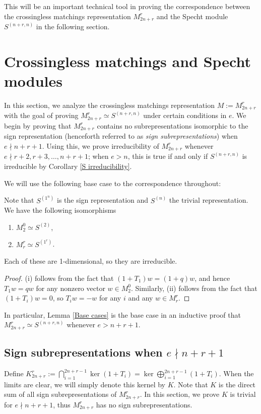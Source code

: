 \documentclass{amsart}
\begin{document}
This will be an important technical tool in proving the correspondence between the crossingless matchings representation $M_{2n + r}^r$ and the Specht module $S^{(n+r,n)}$ in the following section. 

\section{Crossingless matchings and Specht modules}\label{Crossingless Matchings Section}
In this section, we analyze the crossingless matchings representation $M := M_{2n + r}^r$ with the goal of proving $M_{2n + r}^r \simeq S^{(n+r,n)}$ under certain conditions in $e$.
We begin by proving that $M_{2n + r}^r$ contains no subrepresentations isomorphic to the sign representation (henceforth referred to as \emph{sign subrepresentations}) when $e \nmid n + r + 1$.
Using this, we prove irreducibility of $M_{2n + r}^r$ whenever $e \nmid r+2,r+3,\dots,n+r+1$;
when $e>n$, this is true if and only if $S^{(n+r,n)}$ is irreducible by Corollary \ref{S irreducibility}.

We will use the following base case to the correspondence throughout:
\begin{lemma}\label{Base cases}
  Note that $S^{(1^n)}$ is the sign representation and $S^{(n)}$ the trivial representation.
  We have the following isomorphisms
  \begin{enumerate}[label={(\roman*)}]
    \item $M_2^0 \simeq S^{(2)}$,
    \item $M_r^r \simeq S^{(1^r)}$.
  \end{enumerate}
  Each of these are 1-dimensional, so they are irreducible.
\end{lemma}
\begin{proof}
  (i) follows from the fact that $(1 + T_1)w = (1 + q)w$, and hence $T_1w = qw$ for any nonzero vector $w \in M_2^0$.
  Similarly, (ii) follows from the fact that $(1 + T_i)w = 0$, so $T_iw = -w$ for any $i$ and any $w \in M_r^r$.
\end{proof}
In particular, Lemma \ref{Base cases} is the base case in an inductive proof that $M_{2n + r}^r \simeq S^{(n+r,n)}$ whenever $e > n + r + 1$.

\subsection{Sign subrepresentations when $e\nmid n+r+1$}
\label{kernel}

Define $K_{2n+r}^r := \bigcap_{i=1}^{2n+r-1} \ker (1 + T_i) = \ker \bigoplus_{i = 1}^{2n + r - 1} (1 + T_i)$. When the limits are clear, we will simply denote this kernel by $K$. Note that $K$ is the direct sum of all sign subrepresentations of $M_{2n+r}^r$. In this section, we prove $K$ is trivial for $e \nmid n + r + 1$, thus $M_{2n+r}^r$ has no sign subrepresentations.
\end{document}
